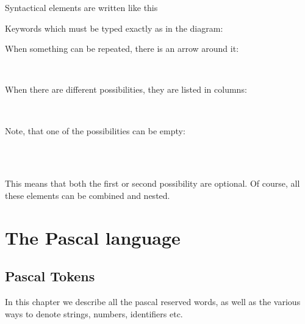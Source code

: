 Syntactical elements are written like this
\begin{mysyntdiag}
\end{mysyntdiag}
Keywords which must be typed exactly as in the diagram:
\begin{mysyntdiag}
\end{mysyntdiag}
When something can be repeated, there is an arrow around it:
\begin{mysyntdiag}
\begin{rep}[b]  \\ \end{rep}
\end{mysyntdiag}
When there are different possibilities, they are listed in columns:
\begin{mysyntdiag}
\begin{stack}
 \\
\end{stack}
\end{mysyntdiag}
Note, that one of the possibilities can be empty:
\begin{mysyntdiag}
\begin{stack}\\
 \\
\end{stack}
\end{mysyntdiag}
This means that both the first or second possibility are optional.
Of course, all these elements can be combined and nested.

\part{The Pascal language}


\chapter{Pascal Tokens}
In this chapter we describe all the pascal reserved words, as well as the
various ways to denote strings, numbers, identifiers etc.

